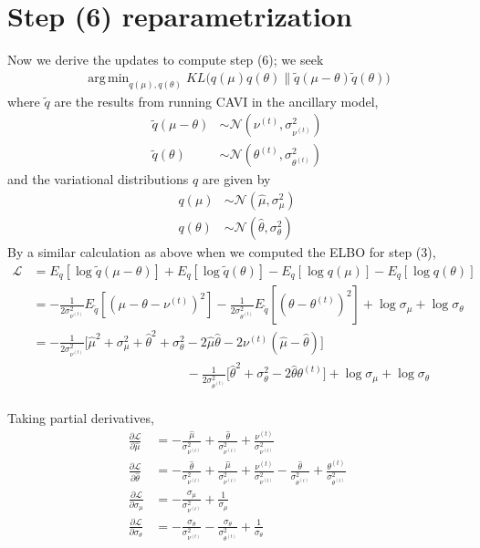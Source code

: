 \documentclass[10pt]{article}
\theoremstyle{plain}
\theoremstyle{definition}
\newcommand{\<}{\langle}
\renewcommand{\>}{\rangle}
\DeclareMathOperator*{\argmin}{arg\,min}
\begin{document}
\section{Step (6) reparametrization}
Now we derive the updates to compute step (6); we seek
\begin{align}
\argmin_{ q(\mu),  q(\theta)} KL\Big( q(\mu)  q(\theta) \| \tilde q(\mu-\theta) \tilde q(\theta)\Big)
\end{align}
where $\tilde q$ are the results from running CAVI in the ancillary model,
\begin{align*}
\tilde q(\mu-\theta) &\sim \mathcal N(\nu^{(t)}, \sigma^2_{\nu^{(t)}})\\
\tilde q(\theta) &\sim \mathcal N(\theta^{(t)}, \sigma^2_{\theta^{(t)}})
\end{align*}
and the variational distributions $q$ are given by
\begin{align}
q(\mu)   &\sim \mathcal N(\hat \mu, \sigma^2_\mu)\\
q(\theta) &\sim \mathcal N(\hat \theta, \sigma^2_{\theta})
\end{align}
By a similar calculation as above when we computed the ELBO for step (3), 
\begin{align}
\mathcal L &= E_{q}[\log \tilde q(\mu-\theta)] + E_{ q}[\log\tilde q(\theta)] - E_{ q}[\log  q(\mu)] - E_{ q}[\log  q(\theta)]\\
	&= -\frac{1}{2\sigma^2_{\nu^{(t)}}} E_{\tilde q}[(\mu-\theta - \nu^{(t)})^2] 
	 - \frac{1}{2\sigma^2_{\theta^{(t)}}} E_{\tilde q}[(\theta - \theta^{(t)})^2]
	 + \log \sigma_\mu + \log\sigma_\theta\\
	 &= -\frac{1}{2\sigma^2_{\nu^{(t)}}} \Big[\hat \mu^2 + \sigma^2_\mu + \hat\theta^2 + \sigma^2_\theta - 2\hat\mu\hat\theta - 2\nu^{(t)}(\hat\mu-\hat\theta)\Big]\\
	 &\quad \quad \quad \quad \quad \quad \quad \quad \quad \quad \quad \quad 
	  - \frac{1}{2\sigma^2_{\theta^{(t)}}} \Big[\hat\theta^2 + \sigma^2_\theta  - 2\hat\theta\theta^{(t)} \Big]
	 + \log \sigma_\mu + \log\sigma_\theta\\
\end{align}

Taking partial derivatives, 
\begin{align}
\frac{\partial \mathcal L}{\partial \hat\mu} &= - \frac{\hat \mu}{\sigma^2_{\nu^{(t)}}} + \frac{\hat \theta}{\sigma^2_{\nu^{(t)}}} +  \frac{\nu^{(t)}}{\sigma^2_{\nu^{(t)}}} \\
\frac{\partial \mathcal L}{\partial \hat\theta} 	&=  - \frac{\hat \theta}{\sigma^2_{\nu^{(t)}}} + \frac{\hat \mu}{\sigma^2_{\nu^{(t)}}} +  \frac{\nu^{(t)}}{\sigma^2_{\nu^{(t)}}} - \frac{\hat\theta}{\sigma^2_{\theta^{(t)}}} + \frac{\theta^{(t)}}{\sigma^2_{\theta^{(t)}}}\\
\frac{\partial \mathcal L}{\partial \sigma_\mu} &= - \frac{\sigma_\mu}{\sigma^2_{\nu^{(t)}}} + \frac{1}{\sigma_\mu}\\
\frac{\partial \mathcal L}{\partial \sigma_\theta} &= - \frac{\sigma_\theta} {\sigma^2_{\nu^{(t)}}} - \frac{\sigma_\theta}{\sigma_{\theta^{(t)}}^2}+ \frac{1}{\sigma_\theta}
\end{align}
\end{document}
